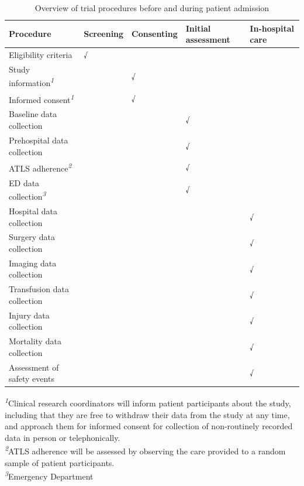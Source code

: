 \documentclass[
]{scrartcl}
\begin{document}
\hypertarget{tbl-procedures-baseline}{}
\setlength{\LTpost}{0mm}
\begin{longtable}{lllll}
\caption{\label{tbl-procedures-baseline}Overview of trial procedures before and during patient admission }\tabularnewline

\toprule
Procedure & Screening & Consenting & Initial assessment & In-hospital care \\ 
\midrule\addlinespace[2.5pt]
Eligibility criteria & √ &  &  &  \\ 
Study information\textsuperscript{\textit{1}} &  & √ &  &  \\ 
Informed consent\textsuperscript{\textit{1}} &  & √ &  &  \\ 
Baseline data collection &  &  & √ &  \\ 
Prehospital data collection &  &  & √ &  \\ 
ATLS adherence\textsuperscript{\textit{2}} &  &  & √ &  \\ 
ED data collection\textsuperscript{\textit{3}} &  &  & √ &  \\ 
Hospital data collection &  &  &  & √ \\ 
Surgery data collection &  &  &  & √ \\ 
Imaging data collection &  &  &  & √ \\ 
Transfusion data collection &  &  &  & √ \\ 
Injury data collection &  &  &  & √ \\ 
Mortality data collection &  &  &  & √ \\ 
Assessment of safety events &  &  &  & √ \\ 
\bottomrule
\end{longtable}
\begin{minipage}{\linewidth}
\textsuperscript{\textit{1}}Clinical research coordinators will inform patient participants about the study, including that they are free to withdraw their data from the study at any time, and approach them for informed consent for collection of non-routinely recorded data in person or telephonically.\\
\textsuperscript{\textit{2}}ATLS adherence will be assessed by observing the care provided to a random sample of patient participants.\\
\textsuperscript{\textit{3}}Emergency Department\\
\end{minipage}

\endgroup

\begingroup
\fontsize{10pt}{11pt}\selectfont
\addtolength{\tabcolsep}{-3pt}
\end{document}
